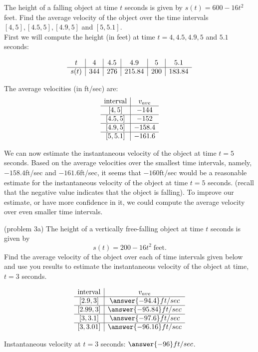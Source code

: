 \documentclass{ximera}
\begin{document}
\begin{example}[example 3]
The height of a falling object at time $t$ seconds is given by $s(t) = 600-16t^2$ feet.
Find the average velocity of the object over the time intervals $[4, 5], [4.5, 5], [4.9, 5]$ and $[5, 5.1]$.\\
First we will compute the height (in feet) at time $t = 4, 4.5, 4.9, 5$ and $5.1$ seconds:
  
\[
\begin{array}{ c | c | c | c | c | c }
   t& 4 & 4.5 & 4.9 & 5 & 5.1 \\ 
	\hline
	s(t) & 344 & 276 & 215.84 & 200 & 183.84
\end{array}
\]

The average velocities (in ft/sec) are:
\[
\begin{array}{ c | c  }
   \text{interval}& v_{ave} \\ 
	\hline
	[4,5] & -144 \\
	\hline
	[4.5,5] & -152 \\
	\hline
	[4.9,5] & -158.4 \\
	\hline
	[5, 5.1] & -161.6
\end{array}
\]

We can now estimate the instantaneous velocity of the object at time $t = 5$ seconds.  Based on the 
average velocities over the smallest time intervals, namely, $-158.4$ft/sec and $-161.6$ft/sec, it seems that $-160$ft/sec would be a reasonable estimate 
for the instantaneous velocity of the object at time $t = 5$ seconds.
(recall that the negative value indicates that the object is falling).
To improve our estimate, or have more confidence in it, we could compute the average velocity over 
even smaller time intervals.

\end{example}

\begin{problem}(problem 3a)
The height of a vertically free-falling object at time $t$ seconds is given by
\[
s(t) = 200 - 16t^2 \; \text{feet}.
\]
Find the average velocity of the object over each of time intervals given below and use you results to estimate the instantaneous velocity
of the object at time, $t = 3$ seconds.

\[
\begin{array}{ c | c  }
   \text{interval}& v_{ave} \\ 
	\hline
	[2.9, 3] & \answer{-94.4}ft/sec \\
	\hline
	[2.99, 3] & \answer{-95.84}ft/sec \\
	\hline
	[3, 3.1] & \answer{-97.6}ft/sec \\
	\hline
	[3, 3.01] & \answer{-96.16}ft/sec
\end{array}
\]


Instantaneous velocity at $t = 3$ seconds: $\answer{-96}ft/sec$.

\end{problem}
\end{document}

